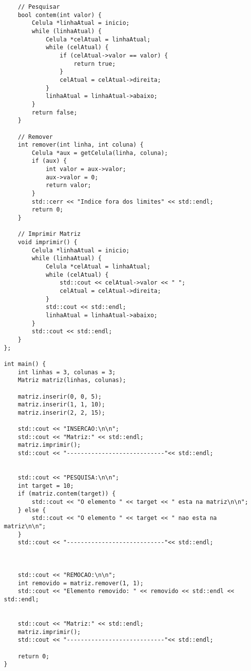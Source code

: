 \documentclass{article}
\begin{document}
\begin{lstlisting}
    // Pesquisar
    bool contem(int valor) {
        Celula *linhaAtual = inicio;
        while (linhaAtual) {
            Celula *celAtual = linhaAtual;
            while (celAtual) {
                if (celAtual->valor == valor) {
                    return true;
                }
                celAtual = celAtual->direita;
            }
            linhaAtual = linhaAtual->abaixo;
        }
        return false;
    }

    // Remover
    int remover(int linha, int coluna) {
        Celula *aux = getCelula(linha, coluna);
        if (aux) {
            int valor = aux->valor;
            aux->valor = 0;
            return valor;
        }
        std::cerr << "Indice fora dos limites" << std::endl;
        return 0;
    }

    // Imprimir Matriz
    void imprimir() {
        Celula *linhaAtual = inicio;
        while (linhaAtual) {
            Celula *celAtual = linhaAtual;
            while (celAtual) {
                std::cout << celAtual->valor << " ";
                celAtual = celAtual->direita;
            }
            std::cout << std::endl;
            linhaAtual = linhaAtual->abaixo;
        }
        std::cout << std::endl;
    }
};

int main() {
    int linhas = 3, colunas = 3;
    Matriz matriz(linhas, colunas);

    matriz.inserir(0, 0, 5);
    matriz.inserir(1, 1, 10);
    matriz.inserir(2, 2, 15);

    std::cout << "INSERCAO:\n\n";
    std::cout << "Matriz:" << std::endl;
    matriz.imprimir();
    std::cout << "----------------------------"<< std::endl;


    std::cout << "PESQUISA:\n\n";
    int target = 10;
    if (matriz.contem(target)) {
        std::cout << "O elemento " << target << " esta na matriz\n\n";
    } else {
        std::cout << "O elemento " << target << " nao esta na matriz\n\n";
    }
    std::cout << "----------------------------"<< std::endl;



    std::cout << "REMOCAO:\n\n";
    int removido = matriz.remover(1, 1);
    std::cout << "Elemento removido: " << removido << std::endl << std::endl;

    
    std::cout << "Matriz:" << std::endl;
    matriz.imprimir();
    std::cout << "----------------------------"<< std::endl;

    return 0;
}

\end{lstlisting}
\end{document}
